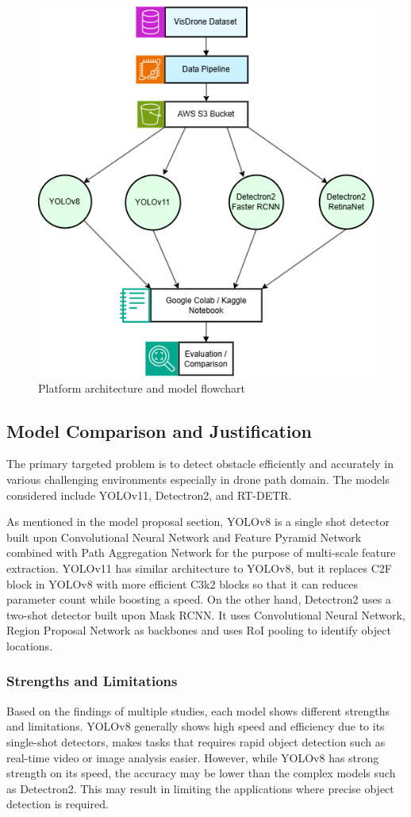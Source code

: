 \documentclass[stu,12pt,floatsintext]{apa7}
\begin{document}
\begin{figure}[!htb]
	\centering
	\includegraphics[width=0.6\linewidth]{images/modelsupportDiagram.png}
	\caption{Platform architecture and model flowchart}
	\label{fig:mlFlowchart}
\end{figure}


\subsection{Model Comparison and Justification}

The primary targeted problem is to detect obstacle efficiently and accurately in various challenging environments especially in drone path domain. The models considered include YOLOv11, Detectron2, and RT-DETR.

As mentioned in the model proposal section, YOLOv8 is a single shot detector built upon Convolutional Neural Network and Feature Pyramid Network combined with Path Aggregation Network for the purpose of multi-scale feature extraction. YOLOv11 has similar architecture to YOLOv8, but it replaces C2F block in YOLOv8 with more efficient C3k2 blocks so that it can reduces parameter count while boosting a speed. On the other hand, Detectron2 uses a two-shot detector built upon Mask RCNN. It uses Convolutional Neural Network, Region Proposal Network as backbones and uses RoI pooling to identify object locations.


\subsubsection{Strengths and Limitations}
Based on the findings of multiple studies, each model shows different strengths and limitations. YOLOv8 generally shows high speed and efficiency due to its single-shot detectors, makes tasks that requires rapid object detection such as real-time video or image analysis easier. However, while YOLOv8 has strong strength on its speed, the accuracy may be lower than the complex models such as Detectron2. This may result in limiting the applications where precise object detection is required.
\end{document}
